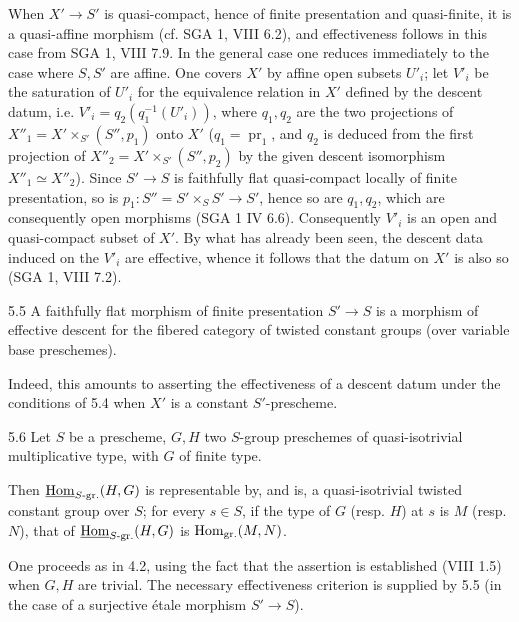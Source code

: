 When $X'\to S'$ is quasi-compact, hence of finite presentation and quasi-finite, it is a quasi-affine morphism (cf. SGA 1, VIII 6.2), and effectiveness follows in this case from SGA 1, VIII 7.9. In the general case one reduces immediately to the case where $S,S'$ are affine. One covers $X'$ by affine open subsets $U'_i$; let $V'_i$ be the saturation of $U'_i$ for the equivalence relation in $X'$ defined by the descent datum, i.e. $V'_i=q_2(q_1^{-1}(U'_i))$, where $q_1,q_2$ are the two projections of $X''_1=X'\times_{S'}(S'',p_1)$ onto $X'$ ($q_1=\operatorname{pr}_1$, and $q_2$ is deduced from the first projection of $X''_2=X'\times_{S'}(S'',p_2)$ by the given descent isomorphism $X''_1\simeq X''_2$). Since $S'\to S$ is faithfully flat quasi-compact locally of finite presentation, so is $p_1:S''=S'\times_S S'\to S'$, hence so are $q_1,q_2$, which are consequently open morphisms (SGA 1 IV 6.6). Consequently $V'_i$ is an open and quasi-compact subset of $X'$. By what has already been seen, the descent data induced on the $V'_i$ are effective, whence it follows that the datum on $X'$ is also so (SGA 1, VIII 7.2).
\begin{corollary}{5.5}\label{X.5.5}
A faithfully flat morphism of finite presentation $S'\to S$ is a morphism of effective descent for the fibered category of twisted constant groups (over variable base preschemes).
\end{corollary}
Indeed, this amounts to asserting the effectiveness of a descent datum under the conditions of 5.4 when $X'$ is a constant $S'$-prescheme.
\begin{theorem}{5.6}\label{X.5.6}
Let $S$ be a prescheme, $G,H$ two $S$-group preschemes of quasi-isotrivial multiplicative type, with $G$ of finite type.

Then $\underline{\operatorname{Hom}}_{S\text{-}\mathrm{gr.}}(H,G)$ is representable by, and is, a quasi-isotrivial twisted constant group over $S$; for every $s\in S$, if the type of $G$ (resp. $H$) at $s$ is $M$ (resp. $N$), that of $\underline{\operatorname{Hom}}_{S\text{-}\mathrm{gr.}}(H,G)$ is $\operatorname{Hom}_{\mathrm{gr.}}(M,N)$.
\end{theorem}
One proceeds as in 4.2, using the fact that the assertion is established (VIII 1.5) when $G,H$ are trivial. The necessary effectiveness criterion is supplied by 5.5 (in the case of a surjective étale morphism $S'\to S$).

